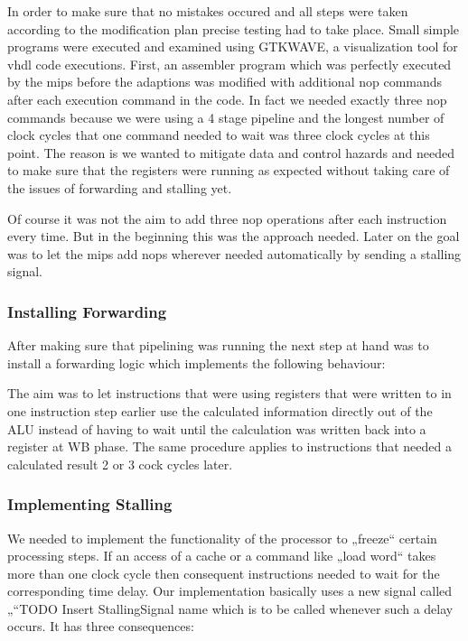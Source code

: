 In order to make sure that no mistakes occured and all steps were taken according to the modification plan precise testing had to take place. Small simple programs were executed and examined using GTKWAVE, a visualization tool for vhdl code executions. First, an assembler program which was perfectly executed by the mips before the adaptions was modified with additional nop commands after each execution command in the code. In fact we needed exactly three nop commands because we were using a 4 stage pipeline and the longest number of clock cycles that one command needed to wait was three clock cycles at this point. The reason is we wanted to mitigate data and control hazards and needed to make sure that the registers were running as expected without taking care of the issues of forwarding and stalling yet. 

Of course it was not the aim to add three nop operations after each instruction every time. But in the beginning this was the approach needed. Later on the goal was to let the mips add nops wherever needed automatically by sending a stalling signal.

\subsubsection{Installing Forwarding}
\label{sec:installingForwarding}

After making sure that pipelining was running the next step at hand was to install a forwarding logic which implements the following behaviour:


The aim was to let instructions that were using registers that were written to in one instruction step earlier use the calculated information directly out of the ALU instead of having to wait until the calculation was written back into a register at WB phase.
The same procedure applies to instructions that needed a calculated result 2 or 3 cock cycles later.
 
\subsubsection{Implementing Stalling}
\label{sec:implementingStalling}

We needed to implement the functionality of the processor to „freeze“ certain processing steps. If an access of a cache or a command like „load word“ takes more than one clock cycle then consequent instructions needed to wait for the corresponding time delay. 
Our implementation basically uses a new signal called „“TODO Insert StallingSignal name which is to be called whenever such a delay occurs. It has three consequences:


